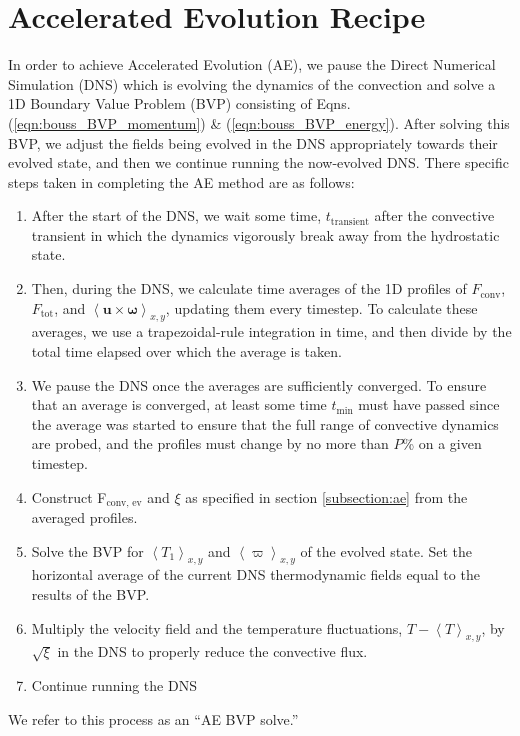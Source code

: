 \documentclass[aps, pre, onecolumn, nofootinbib, notitlepage, groupedaddress, amsfonts, amssymb, amsmath, longbibliography]{revtex4-1}
\newcommand{\angles}[1]{\ensuremath{\left\langle #1 \right\rangle}}
\begin{document}
\appendix
\section{Accelerated Evolution Recipe}
\label{appendix:recipe}
In order to achieve Accelerated Evolution (AE), we pause the Direct Numerical Simulation (DNS)
which is evolving the dynamics of the convection and solve a 1D Boundary Value Problem (BVP)
consisting of Eqns. (\ref{eqn:bouss_BVP_momentum}) \& (\ref{eqn:bouss_BVP_energy}).
After solving this BVP, we adjust the fields being evolved in the DNS appropriately
towards their evolved state, and then we continue running the now-evolved DNS.
There specific steps taken in completing the AE method are as follows:
\begin{enumerate}
\item After the start of the DNS, we wait some time, $t_{\text{transient}}$ after
the convective transient in which the dynamics vigorously break away from the hydrostatic
state.
\item Then, during the DNS, we calculate time averages of the 1D profiles of
$F_{\text{conv}}$, $F_{\text{tot}}$, 
and $\angles{\bm{u} \times \bm{\omega}}_{x,y}$, updating them every timestep.  
To calculate these
averages, we use a trapezoidal-rule integration in time, and then divide by the
total time elapsed over which the average is taken. 
\item We pause the DNS once the averages are sufficiently converged. 
To ensure that an average is converged, at
least some time $t_{\text{min}}$ must have passed since the average was started to
ensure that the full range of convective dynamics are probed, and
the profiles must change by no more than $P$\% on a given timestep.
\item Construct F$_\text{conv, ev}$ and $\xi$ as specified in section \ref{subsection:ae}
from the averaged profiles.
\item Solve the BVP for $\angles{T_1}_{x,y}$ and $\angles{\varpi}_{x,y}$ of the
evolved state.  Set the horizontal average of the current DNS thermodynamic fields
equal to the results of the BVP.
\item Multiply the velocity field and the temperature fluctuations, $T - \angles{T}_{x,y}$,
by $\sqrt{\xi}$ in the DNS to properly reduce the convective flux.
\item Continue running the DNS
\end{enumerate}
We refer to this process as an ``AE BVP solve.''
\end{document}
